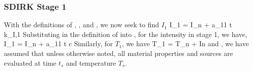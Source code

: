 \subsubsection{SDIRK Stage 1}
With the definitions of , , and , we now seek to find $I_1$
\benum
I_1 = I_n + a_{11} \Delta t k_{I,1} \pep
\label{eq:chap6_early}
\eenum
Substituting in the definition of  into , for the intensity in stage 1, we have,
\benum
I_1 = I_n + a_{11} \Delta t c  
\pep
\label{eq:i_1_start}
\eenum
Similarly, for $T_1$, we have
\benum
T_1 = T_n +  \pep
\label{eq:t_1_start}
\eenum
In  and , we have assumed that unless otherwise noted, all material properties and sources are evaluated at time $t_s$ and temperature $T_s$.


